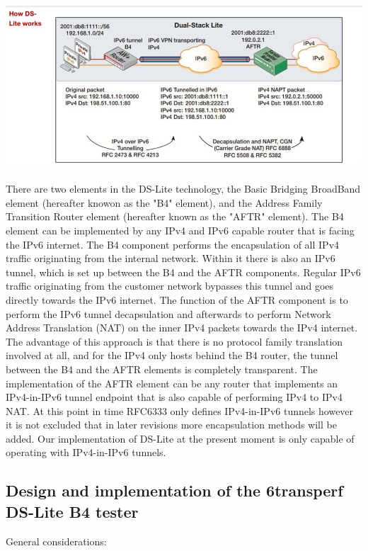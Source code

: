 \documentclass[a4paper,12p]{article}
\begin{document}
\includegraphics[width=\textwidth]{dslitehighlevel}

There are two elements in the DS-Lite technology, the Basic Bridging BroadBand element (hereafter knowon as the "B4" element), and the Address Family Transition Router element (hereafter known as the "AFTR" element). The B4 element can be implemented by any IPv4 and IPv6 capable router that is facing the IPv6 internet. The B4 component performs the encapsulation of all IPv4 traffic originating from the internal network. Within it there is also an IPv6 tunnel, which is set up between the B4 and the AFTR components. Regular IPv6 traffic originating from the customer network bypasses this tunnel and goes directly towards the IPv6 internet. The function of the AFTR component is to perform the IPv6 tunnel decapsulation and afterwards to perform Network Address Translation (NAT) on the inner IPv4 packets towards the IPv4 internet.
The advantage of this approach is that there is no protocol family translation involved at all, and for the IPv4 only hosts behind the B4 router, the tunnel between the B4 and the AFTR elements is completely transparent.
The implementation of the AFTR element can be any router that implements an IPv4-in-IPv6 tunnel endpoint that is also capable of performing IPv4 to IPv4 NAT. At this point in time RFC6333 only defines IPv4-in-IPv6 tunnels however it is not excluded that in later revisions more encapsulation methods will be added. Our implementation of DS-Lite at the present moment is only capable of operating with IPv4-in-IPv6 tunnels.

\subsection{Design and implementation of the 6transperf DS-Lite B4 tester}
General considerations:
\end{document}
